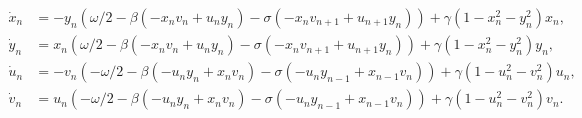 \documentclass[aps,pre,amsmath,amssymb,floatfix,onecolumn,notitlepage,10pt]{revtex4-1}
\begin{document}
\begin{align}
\dot x_n &= -y_n\left(\omega/2 - \beta \left(-x_nv_n+u_ny_n \right) - \sigma\left(-x_nv_{n+1}+u_{n+1}y_n\right) \right) + \gamma\left(1-x_n^2-y_n^2\right)x_n, \\
\dot y_n &= x_n\left(\omega/2 - \beta \left(-x_nv_n+u_ny_n \right) - \sigma\left(-x_nv_{n+1}+u_{n+1}y_n\right) \right) + \gamma\left(1-x_n^2-y_n^2\right)y_n, \\
\dot u_n &= -v_n\left(-\omega/2 - \beta \left(-u_ny_n+x_nv_n \right) - \sigma\left(-u_ny_{n-1}+x_{n-1}v_n\right) \right) + \gamma\left(1-u_n^2-v_n^2\right)u_n, \\
\dot v_n &= u_n\left(-\omega/2 - \beta \left(-u_ny_n+x_nv_n \right) - \sigma\left(-u_ny_{n-1}+x_{n-1}v_n\right) \right) + \gamma\left(1-u_n^2-v_n^2\right)v_n.
\end{align}
\end{document}
